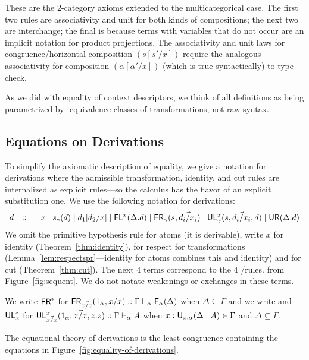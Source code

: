 \noindent These are the 2-category axioms extended to the
multicategorical case.  The first two rules are associativity and unit
for both kinds of compositions; the next two are interchange; the final
is because terms with variables that do not occur are an implicit
notation for product projections.  The associativity and unit laws for
congruence/horizontal composition $(s[s'/x])$ require the analogous
associativity for composition $(\alpha[\alpha'/x])$ (which is true
syntactically) to type check.

As we did with equality of context descriptors, we think of all
definitions as being parametrized by \deq-equivalence-classes of
transformations, not raw syntax.

\subsection{Equations on Derivations}

To simplify the axiomatic description of equality, we give a notation
for derivations where the admissible
transformation, identity, and cut rules are internalized as explicit
rules---so the calculus has the flavor of an explicit substitution one.
We use the following notation for derivations:
\[
\begin{array}{rcl}
d & ::= & {x} \mid s_*(d) \mid d_1[d_2/x] \mid
 \mathsf{FL}^{x}(\Delta.d) \mid \mathsf{FR}_{\gamma}(s,\vec{d_i/x_i}) \mid \mathsf{UL}^{x}_{\gamma}(s,\vec{d_i/x_i},d) \mid \mathsf{UR}(\Delta.d) 
\end{array}
\]
We omit the primitive hypothesis rule for atoms (it is derivable),
write $x$ for identity (Theorem~\ref{thm:identity}),  for
respect for transformations (Lemma~\ref{lem:respectspr}---identity for
atoms combines this and identity) and  for cut
(Theorem~\ref{thm:cut}).  The next 4 terms correspond to the 4
\Usymb/\Fsymb rules.  from Figure~\ref{fig:sequent}.  
We do not notate weakenings or exchanges in these terms.

We write $\mathsf{FR}^*$ for $\mathsf{FR}_{\vec{x/x}}(1_\alpha,\vec{{x}/x}) ::
\Gamma \vdash_{\alpha} \mathsf{F}_{\alpha}(\Delta)$ when $\Delta \subseteq \Gamma$
and we write and $\mathsf{UL}^*_{x}$ for $\mathsf{UL}^{x}_{\vec{x/x}}(1_\alpha,\vec{{x}/x},z.z) ::
\Gamma \vdash_{\alpha} A$ when $x:\mathsf{U}_{x.\alpha}(\Delta \mid A) \in \Gamma$ and
$\Delta \subseteq \Gamma$.  

The equational theory of derivations is the least congruence containing
the equations in Figure~\ref{fig:equality-of-derivations}.


